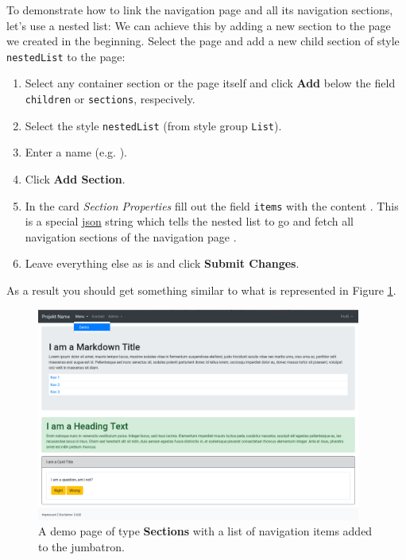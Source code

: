 \documentclass[a4paper,oneside]{book}
\begin{document}
To demonstrate how to link the navigation page  and all its navigation sections, let's use a nested list:
We can achieve this by adding a new section to the page  we created in the beginning.
Select the page  and add a new child section of style \texttt{nestedList} to the page:
\begin{enumerate}
    \item Select any container section or the page itself and click \textbf{Add} below the field \texttt{children} or \texttt{sections}, respecively.
    \item Select the style \texttt{nestedList} (from style group \texttt{List}).
    \item Enter a name (e.g. ).
    \item Click \textbf{Add Section}.
    \item In the card \emph{Section Properties} fill out the field \texttt{items} with the content .
        This is a special \href{http://www.json.org/}{json} string which tells the nested list to go and fetch all navigation sections of the navigation page .
    \item Leave everything else as is and click \textbf{Submit Changes}.
\end{enumerate}

As a result you should get something similar to what is represented in Figure \ref{fig.demo-nav}.

\begin{figure}[ht]
    \centering
    \includegraphics[width=0.95\textwidth]{demo-nav.png}
    \caption{A demo page of type \textbf{Sections} with a list of navigation items added to the jumbatron.}
    \label{fig.demo-nav}
\end{figure}
\end{document}
